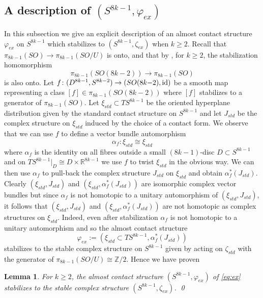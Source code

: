 \documentclass[12pt]{amsart}
\newcommand\R{\mathbb{R}}
\newcommand\Z{\mathbb{Z}}
\newcommand\Id{\textup{id}}
\newcommand\acs{\varphi}  				%
\newcommand\scxs{\zeta}					%
\newtheorem{Lemma}[Theorem]{Lemma}
\theoremstyle{remark}
\begin{document}

\subsection{A description of $(S^{8k{-}1}, \acs_{ex})$ } \label{subsec:explicit}
In this subsection we give an explicit description of an almost contact structure
$\acs_{ex}$ on $S^{8k{-}1}$ which stabilizes to $(S^{8k{-}1}, \scxs_{ex})$ when $k \geq 2$. 
Recall that $\pi_{8k{-}1}(SO) \to \pi_{8k{-}1}(SO/U)$ is onto,
and that by \cite{Kervaire60}, for $k \geq 2$,
the stabilization homomorphism
%
\[ \pi_{8k{-}1}(SO(8k{-}2)) \to \pi_{8k{-}1}(SO) \]
%
is also onto.  Let $f \colon (D^{8k{-}1}, S^{8k{-}2}) \to (SO(8k{-}2),
\Id)$ be a smooth map representing a class $[f] \in
\pi_{8k{-}1}(SO(8k{-}2))$ where $[f]$ stabilizes to a generator of
$\pi_{8k{-}1}(SO)$.  Let $\xi_{std} \subset TS^{8k{-}1}$ be the
oriented hyperplane distribution given by the standard contact
structure on $S^{8k{-}1}$ and let $J_{std}$ be the complex structure
on $\xi_{std}$ induced by the choice of a contact form.  We observe
that we can use $f$ to define a vector bundle automorphism
%
\[ \alpha_f \colon \xi_{std} \cong \xi_{std} \]
%
where $\alpha_f$ is the identity on all fibres outside a small 
$(8k{-}1)$-disc $D \subset S^{8k{-}1}$ and on $TS^{8k{-}1}|_D \cong D \times \R^{8k{-}1}$
we use $f$ to twist $\xi_{std}$ in the obvious way.  We can then use $\alpha_f$ to pull-back
the complex structure $J_{std}$ on $\xi_{std}$ and obtain $\alpha_f^*(J_{std})$.  Clearly
$(\xi_{std}, J_{std})$ and $(\xi_{std}, \alpha_f^*(J_{std}))$ are isomorphic complex vector bundles but
since $\alpha_f$ is not homotopic to a unitary automorphism of $(\xi_{std}, J_{std})$, 
it follows
that $(\xi_{std}, J_{std})$ and $(\xi_{std}, \alpha_f^*(J_{std}))$ are not homotopic as complex structures on $\xi_{std}$. 
Indeed, even after stabilization $\alpha_f$ is not homotopic to a unitary automorphism
and so the almost contact structure 
%
\begin{equation} \label{eq:ex}
\varphi_{ex} := (\xi_{std} \subset TS^{8k{-}1}, \alpha_f^*(J_{std})) 
\end{equation}
% 
stabilizes to the stable complex structure on $S^{8k{-}1}$ given by acting on $\scxs_{std}$ with the generator of $\pi_{8k{-}1}(SO/U) \cong \Z/2$.  Hence we have proven

\begin{Lemma} \label{lem:zeta_ex}
For $k \geq 2$, the almost contact structure $(S^{8k{-}1}, \varphi_{ex})$ of \eqref{eq:ex}
stabilizes to the stable complex structure $(S^{8k{-}1}, \zeta_{ex})$. \qed
\end{Lemma}
\end{document}
